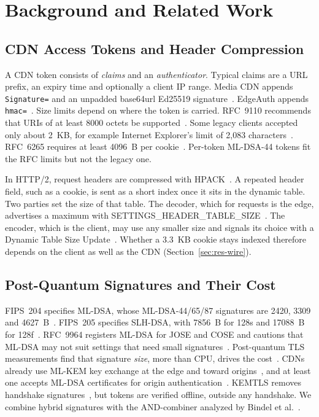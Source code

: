 \section{Background and Related Work}
\label{sec:background}

\subsection{CDN Access Tokens and Header Compression}
A CDN token consists of \emph{claims} and an \emph{authenticator}. Typical claims are a URL prefix, an expiry time and optionally a client IP range. Media CDN appends \texttt{Signature=} and an unpadded base64url Ed25519 signature~\cite{mediacdn-sig}. EdgeAuth appends \texttt{hmac=}~\cite{akamai-edgeauth}. Size limits depend on where the token is carried. RFC~9110 recommends that URIs of at least 8000 octets be supported~\cite{rfc9110}. Some legacy clients accepted only about 2~KB, for example Internet Explorer's limit of 2,083 characters~\cite{ms-urllength}. RFC~6265 requires at least 4096~B per cookie~\cite{rfc6265}. Per-token ML-DSA-44 tokens fit the RFC limits but not the legacy one.

In HTTP/2, request headers are compressed with HPACK~\cite{rfc7541}. A repeated header field, such as a cookie, is sent as a short index once it sits in the dynamic table. Two parties set the size of that table. The decoder, which for requests is the edge, advertises a maximum with SETTINGS\_HEADER\_TABLE\_SIZE~\cite{rfc9113}. The encoder, which is the client, may use any smaller size and signals its choice with a Dynamic Table Size Update~\cite{rfc7541}. Whether a 3.3~KB cookie stays indexed therefore depends on the client as well as the CDN (Section~\ref{sec:res-wire}).

\subsection{Post-Quantum Signatures and Their Cost}
FIPS~204 specifies ML-DSA, whose ML-DSA-44/65/87 signatures are 2420, 3309 and 4627~B~\cite{fips204}. FIPS~205 specifies SLH-DSA, with 7856~B for 128s and \num{17088}~B for 128f~\cite{fips205}. RFC~9964 registers ML-DSA for JOSE and COSE and cautions that ML-DSA may not suit settings that need small signatures~\cite{rfc9964}. Post-quantum TLS measurements find that signature \emph{size}, more than CPU, drives the cost~\cite{sikeridis2020ndss,paquin2020benchmarking,sosnowski2023conext,kampanakis2024ttlb}. CDNs already use ML-KEM key exchange at the edge and toward origins~\cite{cf2023pqorigins,akamai2026e2epqc}, and at least one accepts ML-DSA certificates for origin authentication~\cite{cf2026pqauthorigins}. KEMTLS removes handshake signatures~\cite{schwabe2020kemtls,celi2021measuring}, but tokens are verified offline, outside any handshake. We combine hybrid signatures with the AND-combiner analyzed by Bindel et al.~\cite{bindel2017hybrid}.

